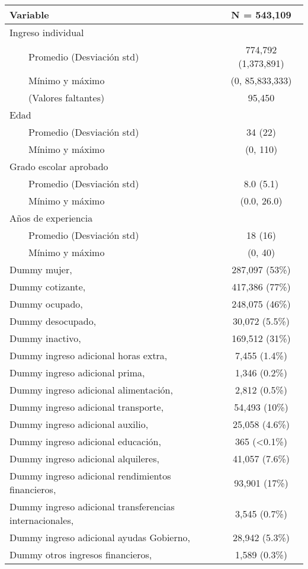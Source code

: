\begin{longtable}{lc}
\toprule
\textbf{Variable} & \textbf{N = 543,109} \\ 
\midrule
Ingreso individual &  \\ 
    Promedio (Desviación std) & 774,792 (1,373,891) \\ 
    Mínimo y máximo & (0, 85,833,333) \\ 
    (Valores faltantes) & 95,450 \\ 
Edad &  \\ 
    Promedio (Desviación std) & 34 (22) \\ 
    Mínimo y máximo & (0, 110) \\ 
Grado escolar aprobado &  \\ 
    Promedio (Desviación std) & 8.0 (5.1) \\ 
    Mínimo y máximo & (0.0, 26.0) \\ 
Años de experiencia &  \\ 
    Promedio (Desviación std) & 18 (16) \\ 
    Mínimo y máximo & (0, 40) \\ 
Dummy mujer,  & 287,097  (53\%) \\ 
Dummy cotizante,  & 417,386  (77\%) \\ 
Dummy ocupado,  & 248,075  (46\%) \\ 
Dummy desocupado,  & 30,072  (5.5\%) \\ 
Dummy inactivo,  & 169,512  (31\%) \\ 
Dummy ingreso adicional horas extra,  & 7,455  (1.4\%) \\ 
Dummy ingreso adicional prima,  & 1,346  (0.2\%) \\ 
Dummy ingreso adicional alimentación,  & 2,812  (0.5\%) \\ 
Dummy ingreso adicional transporte,  & 54,493  (10\%) \\ 
Dummy ingreso adicional auxilio,  & 25,058  (4.6\%) \\ 
Dummy ingreso adicional educación,  & 365  (<0.1\%) \\ 
Dummy ingreso adicional alquileres,  & 41,057  (7.6\%) \\ 
Dummy ingreso adicional rendimientos financieros,  & 93,901  (17\%) \\ 
Dummy ingreso adicional transferencias internacionales,  & 3,545  (0.7\%) \\ 
Dummy ingreso adicional ayudas Gobierno,  & 28,942  (5.3\%) \\ 
Dummy otros ingresos financieros,  & 1,589  (0.3\%) \\ 

\end{longtable}
